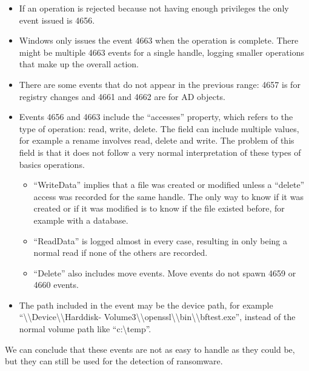 \begin{itemize}
	\item If an operation is rejected because not having enough privileges the only event issued is 4656.
	\item Windows only issues the event 4663 when the operation is complete. There might be multiple 4663 events for a single handle, logging smaller operations that make up the overall action.
	\item There are some events that do not appear in the previous range: 4657 is for registry changes and 4661 and 4662 are for AD objects.
	\item Events 4656 and 4663 include the ``accesses'' property, which refers to the type of operation: read, write, delete.
		The field can include multiple values, for example a rename involves read, delete and write.
		The problem of this field is that it does not follow a very normal interpretation of these types of basics operations.
	\begin{itemize}
		\item``WriteData'' implies that a file was created or modified unless a ``delete'' access was recorded for the same handle. The only way to know if it was created or if it was modified is to know if the file existed before, for example with a database.
		\item``ReadData'' is logged almost in every case, resulting in only being a normal read if none of the others are recorded.
		\item``Delete'' also includes move events. Move events do not spawn 4659 or 4660 events.
	\end{itemize}
	\item The path included in the event may be the device path, for example ``{\textbackslash}{\textbackslash}Device{\textbackslash}{\textbackslash}Harddisk- Volume3{\textbackslash}{\textbackslash}openssl{\textbackslash}{\textbackslash}bin{\textbackslash}{\textbackslash}bftest.exe'', instead of the normal volume path like ``c:{\textbackslash}temp''.
\end{itemize}
\linej
We can conclude that these events are not as easy to handle as they could be, but they can still be used for the detection of ransomware.

